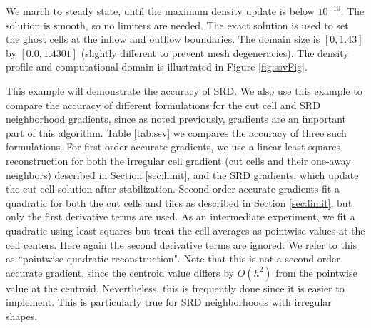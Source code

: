 We march to steady state, until the maximum density update is 
below $10^{-10}$.  
The solution is smooth, so no limiters are needed.
The exact solution is used to set the ghost cells at the inflow and
outflow boundaries. The domain size is $[0,1.43]$ by $[0.0,1.4301]$ 
(slightly different to prevent mesh  degeneracies).  
The density profile and computational domain is illustrated in Figure
\ref{fig:ssvFig}.


This example will demonstrate the accuracy of SRD.
We also use this example to compare the accuracy of different
formulations for the cut cell and SRD neighborhood  gradients, since
as noted previously, gradients are an important part of this algorithm.
Table \ref{tab:ssv} we compares the accuracy of three such formulations.
For first order accurate gradients, we use a linear least squares 
reconstruction for both the irregular cell gradient (cut cells and their one-away neighbors) 
described in Section \ref{sec:limit}, and the SRD gradients, which 
update the cut cell solution after stabilization. Second order accurate 
gradients fit a quadratic for both
the cut cells and tiles as described in Section \ref{sec:limit}, 
but only the first derivative terms are used. 
As an intermediate experiment, we  fit a quadratic using least squares but 
treat the
cell averages as pointwise values at the cell centers. Here again
the second derivative terms are ignored.  We refer to this as ``pointwise
quadratic reconstruction". Note that this is not a
second order accurate gradient, since the centroid value differs by $O(h^2)$
from the pointwise value at the centroid. Nevertheless, this is frequently
done since it is easier to implement. This is particularly true  for SRD
neighborhoods with irregular shapes. 




